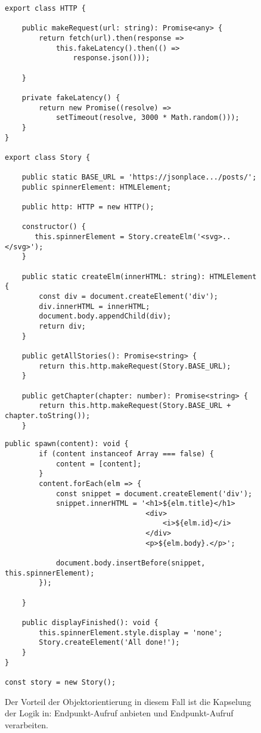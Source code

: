\begin{figure}[H]
\begin{lstlisting}[basicstyle=\small]
export class HTTP {

    public makeRequest(url: string): Promise<any> {
        return fetch(url).then(response =>
            this.fakeLatency().then(() =>
                response.json()));

    }

    private fakeLatency() {
        return new Promise((resolve) =>
            setTimeout(resolve, 3000 * Math.random()));
    }
}

export class Story {

    public static BASE_URL = 'https://jsonplace.../posts/';
    public spinnerElement: HTMLElement;

    public http: HTTP = new HTTP();

    constructor() {
       this.spinnerElement = Story.createElm('<svg>..</svg>');
    }

    public static createElm(innerHTML: string): HTMLElement {
        const div = document.createElement('div');
        div.innerHTML = innerHTML;
        document.body.appendChild(div);
        return div;
    }
    
    public getAllStories(): Promise<string> {
        return this.http.makeRequest(Story.BASE_URL);
    }

    public getChapter(chapter: number): Promise<string> {
        return this.http.makeRequest(Story.BASE_URL + chapter.toString());
    }
\end{lstlisting}
\end{figure}

\begin{figure}[H]\ContinuedFloat
\begin{lstlisting}[basicstyle=\small]
    public spawn(content): void {
        if (content instanceof Array === false) {
            content = [content];
        }
        content.forEach(elm => {
            const snippet = document.createElement('div');
            snippet.innerHTML = '<h1>${elm.title}</h1>
                                 <div>
                                     <i>${elm.id}</i>
                                 </div>
                                 <p>${elm.body}.</p>';

            document.body.insertBefore(snippet, this.spinnerElement);
        });

    }
    
    public displayFinished(): void {
        this.spinnerElement.style.display = 'none';
        Story.createElement('All done!');
    }
}

const story = new Story();
\end{lstlisting}
\caption{Der Vorteil der Objektorientierung in diesem Fall ist die Kapselung der Logik in: Endpunkt-Aufruf anbieten und Endpunkt-Aufruf verarbeiten.}
\end{figure}

